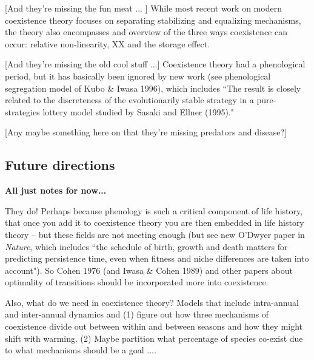 \documentclass[11pt]{article}
\begin{document}
[And they're missing the fun meat ... ] While most recent work on modern coexistence theory focuses on separating stabilizing and equalizing mechanisms, the theory also encompasses and overview of the three ways coexistence can occur: relative non-linearity, XX and the storage effect. %

[And they're missing the old cool stuff ...] Coexistence theory had a phenological period, but it has basically been ignored by new work (see phenological segregation model of Kubo \& Iwasa 1996), which includes ``The result is closely related to the discreteness of the evolutionarily stable strategy in a pure-strategies lottery model studied by Sasaki and Ellner (1995)." 

[Any maybe something here on that they're missing predators and disease?]

\subsection*{Future directions}

{\bf All just notes for now...}

They do! Perhaps because phenology is such a critical component of life history, that once you add it to coexistence theory you are then embedded in life history theory -- but these fields are not meeting enough (but see new O'Dwyer paper in \emph{Nature}, which includes ``the schedule of birth, growth and death matters for predicting persistence time, even when fitness and niche differences are taken into account"). So Cohen 1976 (and Iwasa \& Cohen 1989) and other papers about optimality of transitions should be incorporated more into coexistence. 

Also, what do we need in coexistence theory? Models that include intra-annual and inter-annual dynamics and (1) figure out how three mechanisms of coexistence divide out between within and between seasons and how they might shift with warming. (2) Maybe partition what percentage of species co-exist due to what mechanisms should be a goal .... 
\end{document}
